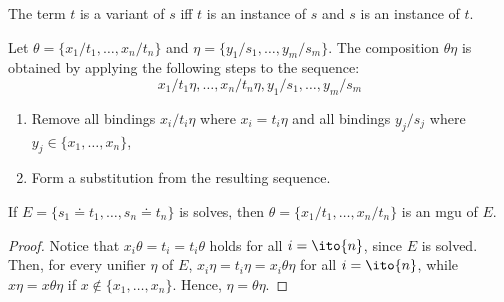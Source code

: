 \begin{lem}
    The term \(t\) is a variant of \(s\) iff \(t\) is an instance of \(s\) and \(s\) is an instance of \(t\).
\end{lem}

\begin{lem}
    Let \(\theta = \lbrace x_1/t_1,\dotsc,x_n/t_n \rbrace\) and \(\eta = \lbrace y_1/s_1,\dotsc,y_m/s_m \rbrace\).
    The composition \(\theta\eta\) is obtained by applying the following steps to the sequence:
    \begin{equation*}
        x_1/t_1\eta,\dotsc,x_n/t_n\eta,y_1/s_1,\dotsc,y_m/s_m
    \end{equation*}
    \begin{enumerate}
        \item Remove all bindings \(x_i/t_i\eta\) where \(x_i = t_i\eta\) and all bindings \(y_j/s_j\) where \(y_j \in \lbrace x_1,\dotsc,x_n \rbrace\),
        \item Form a substitution from the resulting sequence.
    \end{enumerate}
\end{lem}

\begin{lem}
    \label{lem:uni-mgu}
    If \(E = \lbrace s_1 \doteq t_1,\dotsc, s_n \doteq t_n \rbrace\) is solves, then \(\theta = \lbrace x_1/t_1,\dotsc,x_n/t_n \rbrace\) is an \gls{mgu} of \(E\).    
\end{lem}
\begin{proof}
    Notice that \(x_i\theta = t_i = t_i\theta\) holds for all \(i = \ito{n}\), since \(E\) is solved.
    Then, for every unifier \(\eta\) of \(E\), \(x_i\eta = t_i\eta = x_i\theta\eta\) for all \(i = \ito{n}\), while \(x\eta = x\theta\eta\) if \(x \notin \lbrace x_1,\dotsc,x_n \rbrace\). Hence, \(\eta = \theta \eta\).
\end{proof}

